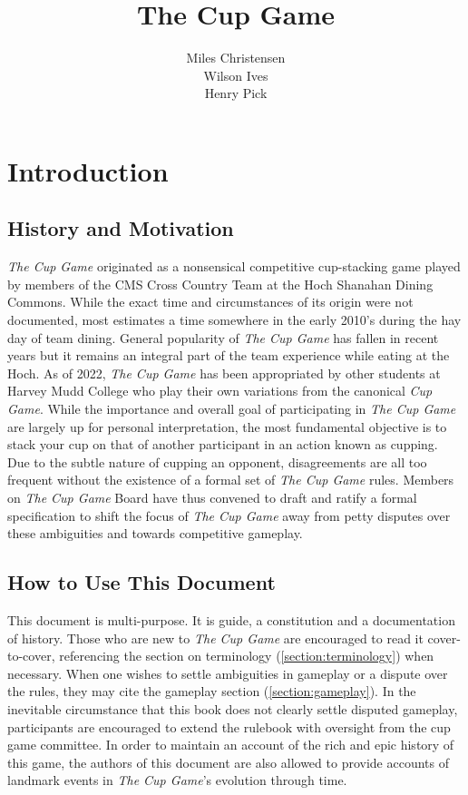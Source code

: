 \documentclass[12pt]{IEEEtran}
\begin{document}
\title{The Cup Game}
\author{Miles Christensen\\Wilson Ives\\ Henry Pick}
\maketitle
\section{Introduction}
\subsection{History and Motivation}
\textit{The Cup Game} originated as a nonsensical competitive cup-stacking game played by members of the CMS Cross Country Team at the Hoch Shanahan Dining Commons. While the exact time and circumstances of its origin were not documented, most estimates a time somewhere in the early 2010's during the hay day of team dining. General popularity of \textit{The Cup Game} has fallen in recent years but it remains an integral part of the team experience while eating at the Hoch. As of 2022, \textit{The Cup Game} has been appropriated by other students at Harvey Mudd College who play their own variations from the canonical \textit{Cup Game}. While the importance and overall goal of participating in \textit{The Cup Game} are largely up for personal interpretation, the most fundamental objective is to stack your cup on that of another participant in an action known as cupping. Due to the subtle nature of cupping an opponent, disagreements are all too frequent without the existence of a formal set of \textit{The Cup Game} rules. Members on \textit{The Cup Game} Board have thus convened to draft and ratify a formal specification to shift the focus of \textit{The Cup Game} away from petty disputes over these ambiguities and towards competitive gameplay.

\subsection{How to Use This Document}
This document is multi-purpose. It is guide, a constitution and a documentation of history. Those who are new to \textit{The Cup Game} are encouraged to read it cover-to-cover, referencing the section on terminology (\ref{section:terminology}) when necessary. When one wishes to settle ambiguities in gameplay or a dispute over the rules, they may cite the gameplay section (\ref{section:gameplay}). In the inevitable circumstance that this book does not clearly settle disputed gameplay, participants are encouraged to extend the rulebook with oversight from the cup game committee. In order to maintain an account of the rich and epic history of this game, the authors of this document are also allowed to provide accounts of landmark events in \textit{The Cup Game}'s evolution through time.
\end{document}
